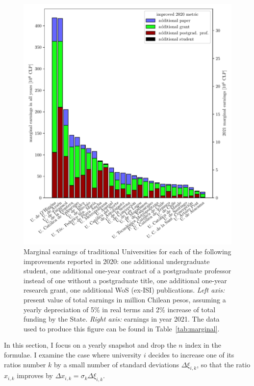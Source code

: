 \documentclass[twocolumn]{article}
\begin{document}
\begin{figure}[p]
\centering
\includegraphics{pdf/marginal-earnings.pdf}
\caption{Marginal earnings of traditional Universities for each of the following improvements reported in 2020: one additional undergraduate student, one additional one-year contract of a postgraduate professor instead of one without a postgraduate title, one additional one-year research grant, one additional WoS (ex-ISI) publications.  \textit{Left axis:} present value of total earnings in million Chilean pesos, assuming a yearly depreciation of 5\% in real terms and 2\% increase of total funding by the State. \textit{Right axis:} earnings in year 2021. The data used to produce this figure can be found in Table~\ref{tab:marginal}.}
\label{fig:marginal}
\end{figure}

In this section, I focus on a yearly snapshot and drop the $n$ index in the formulae.  I examine the case where university $i$ decides to increase one of its ratios number $k$ by a small number of standard deviations $\Delta\xi_{i,k}$, so that the ratio $x_{i,k}$ improves by $\Delta x_{i,k} = \sigma_k\Delta\xi_{i,k}$.
\end{document}
